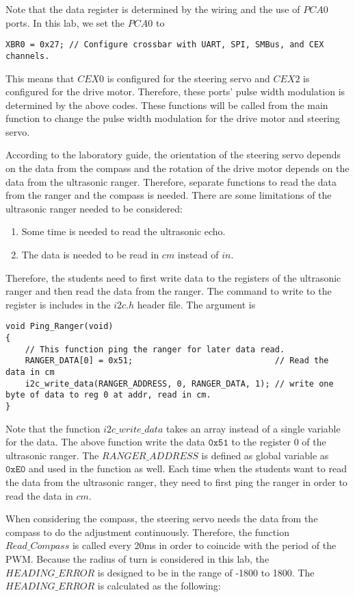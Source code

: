 \documentclass[12pt]{article}
\begin{document}
Note that the data register is determined by the wiring and the use of $PCA0$ ports. In this lab, we set the $PCA0$ to
\begin{lstlisting}
XBR0 = 0x27; // Configure crossbar with UART, SPI, SMBus, and CEX channels.
\end{lstlisting}
This means that $CEX0$ is configured for the steering servo and $CEX2$ is configured for the drive motor. Therefore, these ports' pulse width modulation is determined by the above codes. These functions will be called from the main function to change the pulse width modulation for the drive motor and steering servo. \par
According to the laboratory guide, the orientation of the steering servo depends on the data from the compass and the rotation of the drive motor depends on the data from the ultrasonic ranger. Therefore, separate functions to read the data from the ranger and the compass is needed. There are some limitations of the ultrasonic ranger needed to be considered:
\begin{enumerate}
  \item Some time is needed to read the ultrasonic echo.
  \item The data is needed to be read in $cm$ instead of $in.$
\end{enumerate}
Therefore, the students need to first write data to the registers of the ultrasonic ranger and then read the data from the ranger. The command to write to the register is includes in the $i2c.h$ header file. The argument is
\begin{lstlisting}
void Ping_Ranger(void)
{
    // This function ping the ranger for later data read.
    RANGER_DATA[0] = 0x51;                             // Read the data in cm
    i2c_write_data(RANGER_ADDRESS, 0, RANGER_DATA, 1); // write one byte of data to reg 0 at addr, read in cm.
}
\end{lstlisting}
Note that the function $i2c\_write\_data$ takes an array instead of a single variable for the data. The above function write the data $\texttt{0x51}$ to the register 0 of the ultrasonic ranger. The $RANGER\_ADDRESS$ is defined as global variable as $\texttt{0xE0}$ and used in the function as well. Each time when the students want to read the data from the ultrasonic ranger, they need to first ping the ranger in order to read the data in $cm.$ \par
When considering the compass, the steering servo needs the data from the compass to do the adjustment continuously. Therefore, the function $Read\_Compass$ is called every 20ms in order to coincide with the period of the PWM. Because the radius of turn is considered in this lab, the $HEADING\_ERROR$ is designed to be in the range of -1800 to 1800. The $HEADING\_ERROR$ is calculated as the following:
\end{document}
